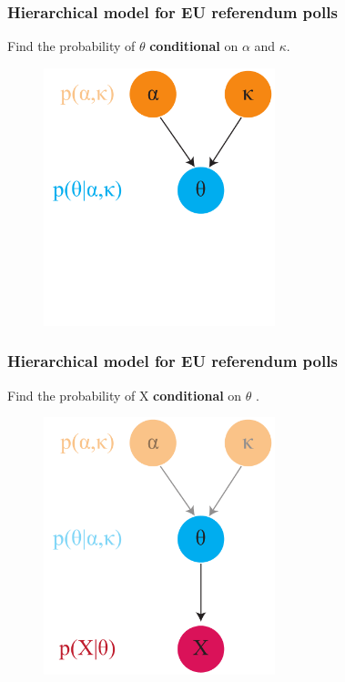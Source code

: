 \documentclass[handout]{beamer}
\begin{document}
\begin{frame}
	\frametitle{Hierarchical model for EU referendum polls}
	
	Find the probability of $\theta$ \textbf{conditional} on $\alpha$ and $\kappa$.
	
	\begin{figure}[ht]
		\centerline{\includegraphics[width=0.6\textwidth]{figures/lec6_conditionalIndependence3.pdf}}
	\end{figure}
	
\end{frame}

\begin{frame}
	\frametitle{Hierarchical model for EU referendum polls}
	
	Find the probability of X \textbf{conditional} on $\theta$ .
	
	\begin{figure}[ht]
		\centerline{\includegraphics[width=0.6\textwidth]{figures/lec6_conditionalIndependence2.pdf}}
	\end{figure}
	
\end{frame}
\end{document}
